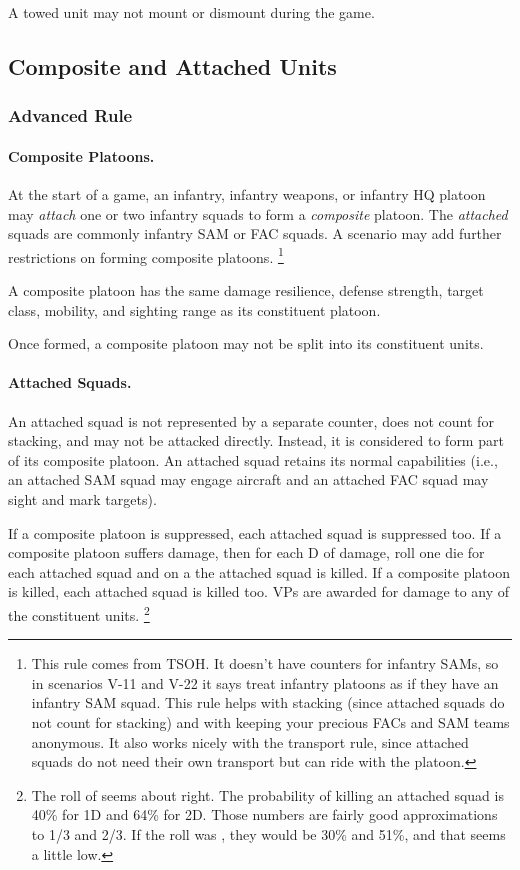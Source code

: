 \documentclass[10pt]{article}
\newcommand{\note}[1]{%
    \footnote{%
        \setlength{\parindent}{0pt}%
        \setlength{\parskip}{\smallskipamount}%
        #1
    }%
}
\begin{document}
A towed unit may not mount or dismount during the game.

\subsection{Composite and Attached Units}

\subsubsection{Advanced Rule}

\paragraph{Composite Platoons.}

At the start of a game, an infantry, infantry weapons, or infantry HQ platoon may \emph{attach} one or two infantry squads to form a \emph{composite} platoon.
The \emph{attached} squads are commonly infantry SAM or FAC squads.
A scenario may add further restrictions on forming composite platoons.%
\note{
    This rule comes from TSOH. It doesn't have counters for infantry SAMs, so in scenarios V-11 and V-22 it says treat infantry platoons as if they have an infantry SAM squad. This rule helps with stacking (since attached squads do not count for stacking) and with keeping your precious FACs and SAM teams anonymous. It also works nicely with the transport rule, since attached squads do not need their own transport but can ride with the platoon.
}

A composite platoon has the same damage resilience, defense strength, target class, mobility, and sighting range as its constituent platoon.

Once formed, a composite platoon may not be split into its constituent units.

\paragraph{Attached Squads.}

An attached squad is not represented by a separate counter, does not count for stacking, and may not be attacked directly.
Instead, it is considered to form part of its composite platoon.
An attached squad retains its normal capabilities (i.e., an attached SAM squad may engage aircraft and an attached FAC squad may sight and mark targets).

If a composite platoon is suppressed, each attached squad is suppressed too.
If a composite platoon suffers damage, then for each D of damage, roll one die for each attached squad and on a  the attached squad is killed.
If a composite platoon is killed, each attached squad is killed too.
VPs are awarded for damage to any of the constituent units.%
\note{
    The roll of  seems about right. The probability of killing an attached squad is 40\% for 1D and 64\% for 2D. Those numbers are fairly good approximations to 1/3 and 2/3. If the roll was \minusafter{3}, they would be 30\% and 51\%, and that seems a little low.
}
\end{document}
